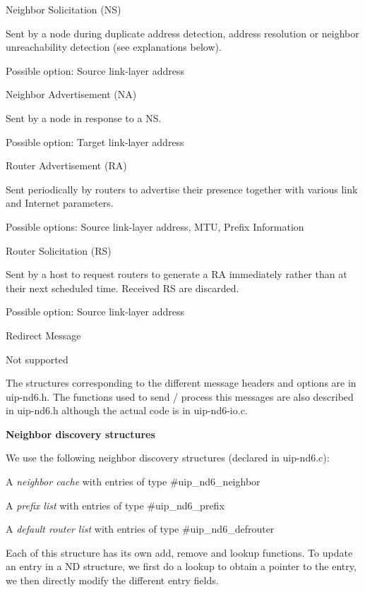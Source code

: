 \begin{DoxyItemize}
\item \-Neighbor \-Solicitation (\-N\-S)\par
 \-Sent by a node during duplicate address detection, address resolution or neighbor unreachability detection (see explanations below).\par
 \-Possible option\-: \-Source link-\/layer address \item \-Neighbor \-Advertisement (\-N\-A)\par
 \-Sent by a node in response to a \-N\-S.\par
 \-Possible option\-: \-Target link-\/layer address \item \-Router \-Advertisement (\-R\-A)\par
 \-Sent periodically by routers to advertise their presence together with various link and \-Internet parameters.\par
 \-Possible options\-: \-Source link-\/layer address, \-M\-T\-U, \-Prefix \-Information \item \-Router \-Solicitation (\-R\-S)\par
 \-Sent by a host to request routers to generate a \-R\-A immediately rather than at their next scheduled time. \-Received \-R\-S are discarded.\par
 \-Possible option\-: \-Source link-\/layer address \item \-Redirect \-Message\par
 \-Not supported\end{DoxyItemize}
\-The structures corresponding to the different message headers and options are in uip-\/nd6.\-h. \-The functions used to send / process this messages are also described in uip-\/nd6.\-h although the actual code is in uip-\/nd6-\/io.\-c.

{\bfseries \-Neighbor discovery structures }\par
 \-We use the following neighbor discovery structures (declared in uip-\/nd6.\-c)\-: \begin{DoxyItemize}
\item \-A {\itshape neighbor cache\/} with entries of type \#uip\-\_\-nd6\-\_\-neighbor \item \-A {\itshape prefix list\/} with entries of type \#uip\-\_\-nd6\-\_\-prefix \item \-A {\itshape default router list\/} with entries of type \#uip\-\_\-nd6\-\_\-defrouter\end{DoxyItemize}
\-Each of this structure has its own add, remove and lookup functions. \-To update an entry in a \-N\-D structure, we first do a lookup to obtain a pointer to the entry, we then directly modify the different entry fields.

